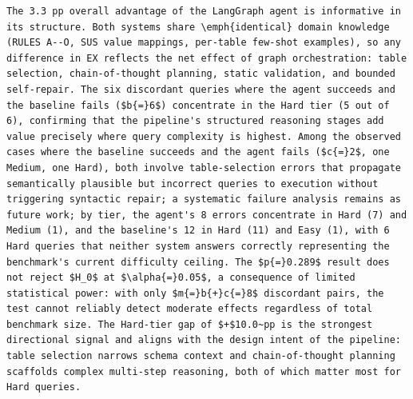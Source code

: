\documentclass[11pt,a4paper]{article}
\begin{document}
\begin{originalblock}
\begin{lstlisting}[style=texsnippet]
The 3.3 pp overall advantage of the LangGraph agent is informative in its structure. Both systems share \emph{identical} domain knowledge (RULES A--O, SUS value mappings, per-table few-shot examples), so any difference in EX reflects the net effect of graph orchestration: table selection, chain-of-thought planning, static validation, and bounded self-repair. The six discordant queries where the agent succeeds and the baseline fails ($b{=}6$) concentrate in the Hard tier (5 out of 6), confirming that the pipeline's structured reasoning stages add value precisely where query complexity is highest. Among the observed cases where the baseline succeeds and the agent fails ($c{=}2$, one Medium, one Hard), both involve table-selection errors that propagate semantically plausible but incorrect queries to execution without triggering syntactic repair; a systematic failure analysis remains as future work; by tier, the agent's 8 errors concentrate in Hard (7) and Medium (1), and the baseline's 12 in Hard (11) and Easy (1), with 6 Hard queries that neither system answers correctly representing the benchmark's current difficulty ceiling. The $p{=}0.289$ result does not reject $H_0$ at $\alpha{=}0.05$, a consequence of limited statistical power: with only $m{=}b{+}c{=}8$ discordant pairs, the test cannot reliably detect moderate effects regardless of total benchmark size. The Hard-tier gap of $+$10.0~pp is the strongest directional signal and aligns with the design intent of the pipeline: table selection narrows schema context and chain-of-thought planning scaffolds complex multi-step reasoning, both of which matter most for Hard queries.
\end{lstlisting}
\end{originalblock}
\end{document}
